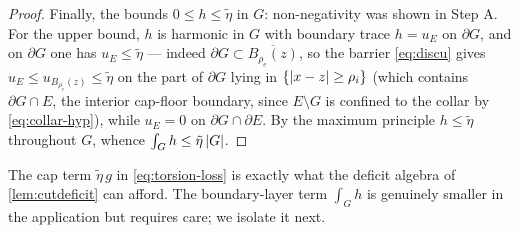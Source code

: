 \begin{proof}
Finally, the bounds $0\le h\le\tilde\eta$ in $G$: non-negativity was shown in
Step A. For the upper bound, $h$ is harmonic in $G$ with boundary trace
$h=u_E$ on $\partial G$, and on $\partial G$ one has $u_E\le\tilde\eta$
--- indeed $\partial G\subset\overline{B_{\rho_e}(z)}$, so the barrier
\eqref{eq:discu} gives $u_E\le u_{B_{\rho_e}(z)}\le\tilde\eta$ on the part of
$\partial G$ lying in $\{\left\lvert x-z\right\rvert\ge\rho_i\}$ (which contains
$\partial G\cap E$, the interior cap-floor boundary, since $E\setminus G$ is
confined to the collar by \eqref{eq:collar-hyp}), while $u_E=0$ on
$\partial G\cap\partial E$. By the maximum principle $h\le\tilde\eta$
throughout $G$, whence $\int_G h\le\tilde\eta\left\lvert G\right\rvert$.
\end{proof}

The cap term $\tilde\eta\,g$ in \eqref{eq:torsion-loss} is exactly what the
deficit algebra of \cref{lem:cutdeficit} can afford. The boundary-layer term
$\int_G h$ is genuinely smaller in the application but requires care; we
isolate it next.

